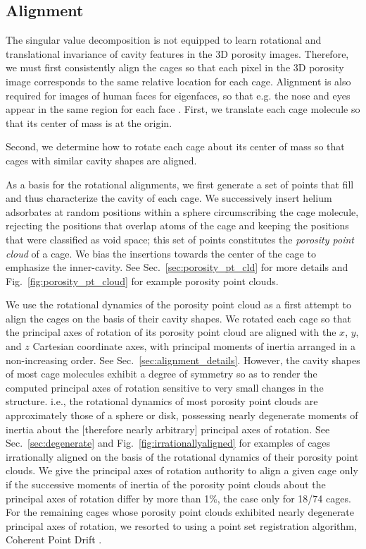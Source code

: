 \documentclass[journal=jacsat,manuscript=article,layout=traditional]{achemso}
\begin{document}
\subsection{Alignment}
\label{sec:alignment}
{\color{red} The singular value decomposition is not equipped to learn rotational and translational invariance of cavity features in the 3D porosity images.} Therefore, we must first consistently align the cages so that each pixel in the 3D porosity image corresponds to the same relative location for each cage. 
Alignment is also required for images of human faces for eigenfaces, so that e.g. the nose and eyes appear in the same region for each face \cite{zhang2008eigenfaces}. First, we translate each cage molecule so that its center of mass is at the origin. {\color{red} Second, we determine how to rotate each cage about its center of mass so that cages with similar cavity shapes are aligned.

As a basis for the rotational alignments, we first generate a set of points that fill and thus characterize the cavity of each cage. We successively insert helium adsorbates at random positions within a sphere circumscribing the cage molecule, rejecting the positions that overlap atoms of the cage and keeping the positions that were classified as void space; this set of points constitutes the \emph{porosity point cloud} of a cage. We bias the insertions towards the center of the cage to emphasize the inner-cavity. See Sec.~\ref{sec:porosity_pt_cld} for more details and Fig.~\ref{fig:porosity_pt_cloud} for example porosity point clouds.

We use the rotational dynamics of the porosity point cloud as a first attempt to align the cages on the basis of their cavity shapes. We rotated each cage so that the principal axes of rotation of its porosity point cloud are aligned with the $x$, $y$, and $z$ Cartesian coordinate axes, with principal moments of inertia arranged in a non-increasing order. See Sec.~\ref{sec:alignment_details}. However, the cavity shapes of most cage molecules exhibit a degree of symmetry so as to render the computed principal axes of rotation sensitive to very small changes in the structure. i.e., the rotational dynamics of most porosity point clouds are approximately those of a sphere or disk, possessing nearly degenerate moments of inertia about the [therefore nearly arbitrary] principal axes of rotation. See Sec.~\ref{sec:degenerate} and Fig.~\ref{fig:irrationallyaligned} for examples of cages irrationally aligned on the basis of the rotational dynamics of their porosity point clouds.
We give the principal axes of rotation authority to align a given cage only if the successive moments of inertia of the porosity point clouds about the principal axes of rotation differ by more than 1\%, the case only for 18/74 cages. For the remaining cages whose porosity point clouds exhibited nearly degenerate principal axes of rotation, we resorted to using a point set registration algorithm, Coherent Point Drift \cite{myronenko2010point}.

}
\end{document}
